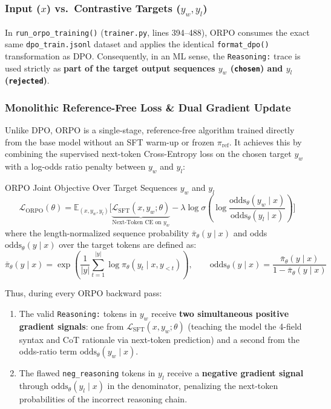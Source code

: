 \documentclass[10pt,letterpaper]{article}
\begin{document}
\subsubsection*{Input ($x$) vs.\ Contrastive Targets ($y_w, y_l$)}
In \texttt{run\_orpo\_training()} (\texttt{trainer.py}, lines 394--488), ORPO consumes the exact same \texttt{dpo\_train.jsonl} dataset and applies the identical \texttt{format\_dpo()} transformation as DPO. Consequently, in an ML sense, the \texttt{Reasoning:} trace is used strictly as \textbf{part of the target output sequences $y_w$ (\texttt{chosen}) and $y_l$ (\texttt{rejected})}.

\subsubsection*{Monolithic Reference-Free Loss \& Dual Gradient Update}
Unlike DPO, ORPO is a single-stage, reference-free algorithm trained directly from the base model without an SFT warm-up or frozen $\pi_{\text{ref}}$. It achieves this by combining the supervised next-token Cross-Entropy loss on the chosen target $y_w$ with a log-odds ratio penalty between $y_w$ and $y_l$:

\begin{mathbox}{ORPO Joint Objective Over Target Sequences $y_w$ and $y_l$}
\begin{equation}
\mathcal{L}_{\text{ORPO}}(\theta) = \mathbb{E}_{(x, y_w, y_l)} \Big[ \underbrace{\mathcal{L}_{\text{SFT}}(x, y_w; \theta)}_{\text{Next-Token CE on } y_w} - \lambda \log \sigma \left( \log \frac{\text{odds}_\theta(y_w \mid x)}{\text{odds}_\theta(y_l \mid x)} \right) \Big]
\end{equation}
where the length-normalized sequence probability $\bar{\pi}_\theta(y \mid x)$ and odds $\text{odds}_\theta(y \mid x)$ over the target tokens are defined as:
\begin{equation}
\bar{\pi}_\theta(y \mid x) = \exp\left( \frac{1}{|y|} \sum_{t=1}^{|y|} \log \pi_\theta(y_t \mid x, y_{<t}) \right), \qquad \text{odds}_\theta(y \mid x) = \frac{\bar{\pi}_\theta(y \mid x)}{1 - \bar{\pi}_\theta(y \mid x)}
\end{equation}
\end{mathbox}

Thus, during every ORPO backward pass:
\begin{enumerate}[leftmargin=18pt, itemsep=2pt]
    \item The valid \texttt{Reasoning:} tokens in $y_w$ receive \textbf{two simultaneous positive gradient signals}: one from $\mathcal{L}_{\text{SFT}}(x, y_w; \theta)$ (teaching the model the 4-field syntax and CoT rationale via next-token prediction) and a second from the odds-ratio term $\text{odds}_\theta(y_w \mid x)$.
    \item The flawed \texttt{neg\_reasoning} tokens in $y_l$ receive a \textbf{negative gradient signal} through $\text{odds}_\theta(y_l \mid x)$ in the denominator, penalizing the next-token probabilities of the incorrect reasoning chain.
\end{enumerate}
\end{document}
